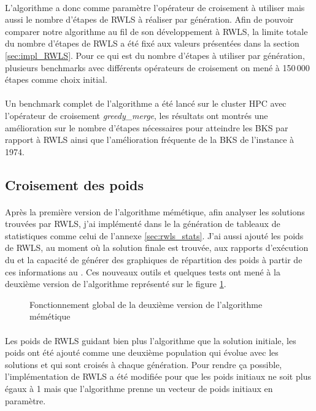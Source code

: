 \documentclass[a4paper,11pt,twoside,french,report]{../common/simplem}
\begin{document}
				\paragraph*{}
					L'algorithme a donc comme paramètre l'opérateur de croisement à utiliser mais aussi le nombre d'étapes de \gls{RWLS} à réaliser par génération. Afin de pouvoir comparer notre algorithme au fil de son développement à \gls{RWLS}, la limite totale du nombre d'étapes de \gls{RWLS} a été fixé aux valeurs présentées dans la section \ref{sec:impl_RWLS}. Pour ce qui est du nombre d'étapes à utiliser par génération, plusieurs benchmarks avec différents opérateurs de croisement on mené à 150\,000 étapes comme choix initial.
				\paragraph*{}
					Un benchmark complet de l'algorithme a été lancé sur le cluster \gls{HPC} avec l'opérateur de croisement \textit{greedy\_merge}, les résultats ont montrés une amélioration sur le nombre d'étapes nécessaires pour atteindre les \gls{BKS} par rapport à \gls{RWLS} ainsi que l'amélioration fréquente de la \gls{BKS} de l'instance  à 1974.
			\subsection{Croisement des poids}
				\paragraph*{}
					Après la première version de l'algorithme mémétique, afin analyser les solutions trouvées par \gls{RWLS}, j'ai implémenté dans le \printer{} la génération de tableaux de statistiques comme celui de l'annexe \ref{sec:rwls_stats}. J'ai aussi ajouté les poids de \gls{RWLS}, au moment où la solution finale est trouvée, aux rapports d'exécution du \solver{} et la capacité de générer des graphiques de répartition des poids à partir de ces informations au \printer{}. Ces nouveaux outils et quelques tests ont mené à la deuxième version de l'algorithme représenté sur le figure \ref{fig:memetic_algorithm_v2}.
				\begin{figure}[H]
					\centering%
					\caption{Fonctionnement global de la deuxième version de l'algorithme mémétique}%
					\label{fig:memetic_algorithm_v2}%
				\end{figure}
				\paragraph*{}
					Les poids de \gls{RWLS} guidant bien plus l'algorithme que la solution initiale, les poids ont été ajouté comme une deuxième population qui évolue avec les solutions et qui sont croisés à chaque génération. Pour rendre ça possible, l'implémentation de \gls{RWLS} a été modifiée pour que les poids initiaux ne soit plus égaux à 1 mais que l'algorithme prenne un vecteur de poids initiaux en paramètre.
\end{document}
